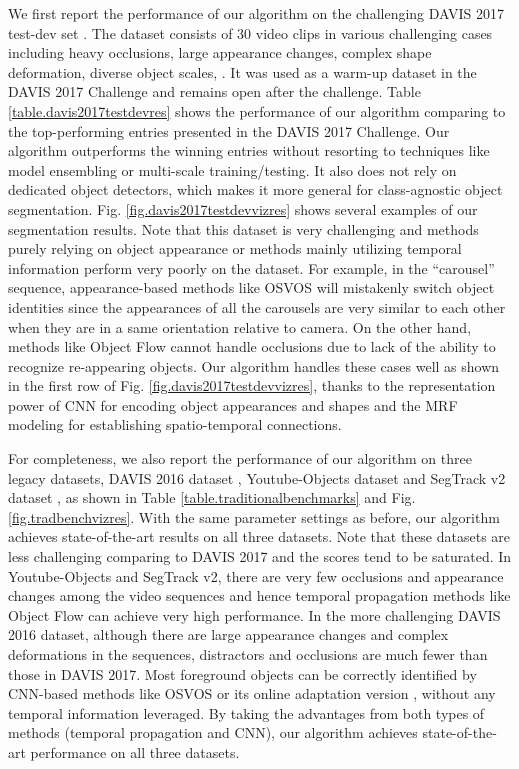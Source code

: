 \documentclass[10pt,twocolumn,letterpaper]{article}
\begin{document}
We first report the performance of our algorithm on the challenging DAVIS 2017 test-dev set \cite{PontTuset2017davischallenge}.
The dataset consists of 30 video clips in various challenging cases including heavy occlusions, large appearance changes, complex shape deformation,
diverse object scales, \etc. It was used as a warm-up dataset in the DAVIS 2017 Challenge and remains open after the challenge.
Table \ref{table.davis2017testdevres} shows the performance of our algorithm comparing to the top-performing entries presented in the DAVIS 2017 Challenge.
Our algorithm outperforms the winning entries without resorting to techniques like model ensembling or multi-scale training/testing.
It also does not rely on dedicated object detectors, which makes it more general for class-agnostic object segmentation.
Fig. \ref{fig.davis2017testdevvizres} shows several examples of our segmentation results. Note that this dataset is very challenging and
methods purely relying on object appearance or methods mainly utilizing temporal information perform very poorly on the dataset.
For example, in the ``carousel'' sequence, appearance-based methods like OSVOS \cite{caelles2017one} will mistakenly switch object identities since the appearances
of all the carousels are very similar to each other when they are in a same orientation relative to camera.
On the other hand, methods like Object Flow \cite{tsai2016video} cannot handle occlusions due to lack of the ability to recognize re-appearing objects.
Our algorithm handles these cases well as shown in the first row of Fig. \ref{fig.davis2017testdevvizres},
thanks to the representation power of CNN for encoding object appearances and shapes
and the MRF modeling for establishing spatio-temporal connections.


For completeness, we also report the performance of our algorithm on three legacy datasets, DAVIS 2016 dataset \cite{perazzi2016benchmark},
Youtube-Objects dataset \cite{prest2012learning,jain2014supervoxel} and SegTrack v2 dataset \cite{li2013video},
as shown in Table \ref{table.traditionalbenchmarks} and Fig. \ref{fig.tradbenchvizres}.
With the same parameter settings as before, our algorithm achieves state-of-the-art results on all three datasets.
Note that these datasets are less challenging comparing to DAVIS 2017 and the scores tend to be saturated.
In Youtube-Objects and SegTrack v2, there are very few occlusions and appearance changes among the video sequences
and hence temporal propagation methods like Object Flow \cite{tsai2016video} can achieve very high performance.
In the more challenging DAVIS 2016 dataset, although there are large appearance changes and complex deformations in the sequences,
distractors and occlusions are much fewer than those in DAVIS 2017.
Most foreground objects can be correctly identified by CNN-based methods like
OSVOS \cite{caelles2017one} or its online adaptation version \cite{voigtlaender2017online},
without any temporal information leveraged.
By taking the advantages from both types of methods (temporal propagation and CNN),
our algorithm achieves state-of-the-art performance on all three datasets.
\end{document}
